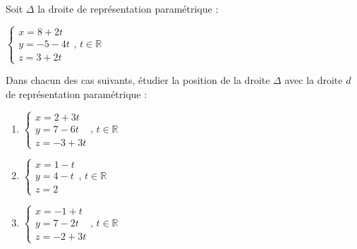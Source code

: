 \documentclass{cornouaille}
\begin{document}
\begin{exercice}
  Soit $\Delta$ la droite de représentation paramétrique :

  \begin{center}
    $\begin{cases}x=8+2t \\y=-5-4t \\z=3+2t \end{cases}$,
    $t\in\mathbb{R}$
  \end{center}

  Dans chacun des cas suivants, étudier la position de la droite
  $\Delta$ avec la droite $d$ de représentation paramétrique :
  \begin{enumerate}
  \item \begin{center}
      $\begin{cases}x=2+3t\\y=7-6t \\z=-3+3t\end{cases}$,
      $t\in\mathbb{R}$
    \end{center}
  \item \begin{center} $\begin{cases}x=1-t \\y=4-t \\z=2 \end{cases}$, $t\in\mathbb{R}$
    \end{center}
  \item \begin{center}
      $\begin{cases}x=-1+t \\y=7-2t \\z=-2+3t \end{cases}$,
      $t\in\mathbb{R}$
    \end{center}
  \end{enumerate}
\end{exercice}
\end{document}
